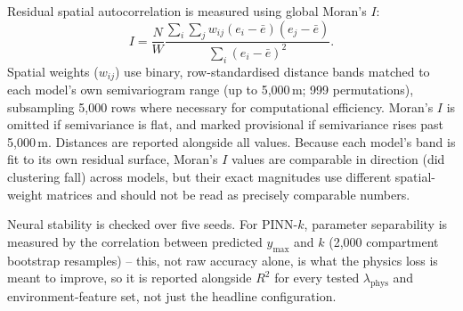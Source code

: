 Residual spatial autocorrelation is measured using global Moran's $I$:
\begin{equation}
I=\frac{N}{W}\frac{\sum_i\sum_j w_{ij}(e_i-\bar e)(e_j-\bar e)}{\sum_i(e_i-\bar e)^2}.
\label{eq:morans-i}
\end{equation}
Spatial weights ($w_{ij}$) use binary, row-standardised distance bands matched to each model's own semivariogram range (up to 5,000\,m; 999 permutations), subsampling 5,000 rows where necessary for computational efficiency. Moran's $I$ is omitted if semivariance is flat, and marked provisional if semivariance rises past 5,000\,m. Distances are reported alongside all values. Because each model's band is fit to its own residual surface, Moran's $I$ values are comparable in direction (did clustering fall) across models, but their exact magnitudes use different spatial-weight matrices and should not be read as precisely comparable numbers.


Neural stability is checked over five seeds. For PINN-$k$, parameter separability is measured by the correlation between predicted $y_{\max}$ and $k$ (2,000 compartment bootstrap resamples) -- this, not raw accuracy alone, is what the physics loss is meant to improve, so it is reported alongside $R^2$ for every tested $\lambda_{\mathrm{phys}}$ and environment-feature set, not just the headline configuration. %
